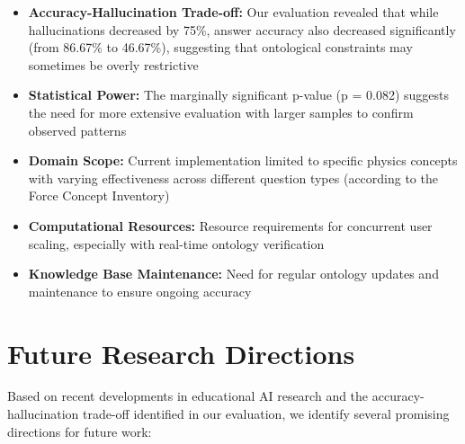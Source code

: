 \begin{itemize}
    \item \textbf{Accuracy-Hallucination Trade-off:} Our evaluation revealed that while hallucinations decreased by 75\%, answer accuracy also decreased significantly (from 86.67\% to 46.67\%), suggesting that ontological constraints may sometimes be overly restrictive
    
    \item \textbf{Statistical Power:} The marginally significant p-value (p = 0.082) suggests the need for more extensive evaluation with larger samples to confirm observed patterns
    
    \item \textbf{Domain Scope:} Current implementation limited to specific physics concepts with varying effectiveness across different question types (according to the Force Concept Inventory)
    
    \item \textbf{Computational Resources:} Resource requirements for concurrent user scaling, especially with real-time ontology verification
    
    \item \textbf{Knowledge Base Maintenance:} Need for regular ontology updates and maintenance to ensure ongoing accuracy
\end{itemize}

\section{Future Research Directions}
\label{sec:future-work}

Based on recent developments in educational AI research and the accuracy-hallucination trade-off identified in our evaluation, we identify several promising directions for future work:

